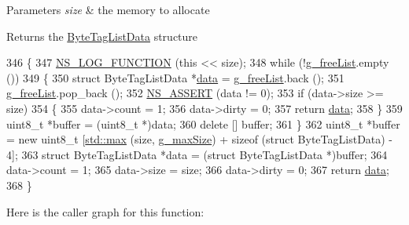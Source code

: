 \begin{DoxyParams}{Parameters}
{\em size} & the memory to allocate \\
\hline
\end{DoxyParams}
\begin{DoxyReturn}{Returns}
the \hyperlink{structns3_1_1ByteTagListData}{Byte\+Tag\+List\+Data} structure 
\end{DoxyReturn}

\begin{DoxyCode}
346 \{
347   \hyperlink{log-macros-disabled_8h_a90b90d5bad1f39cb1b64923ea94c0761}{NS\_LOG\_FUNCTION} (\textcolor{keyword}{this} << size);
348   \textcolor{keywordflow}{while} (!\hyperlink{group__packet_gaed1170b07d22fd956e755d86bf5e5f08}{g\_freeList}.empty ())
349     \{
350       \textcolor{keyword}{struct }ByteTagListData *\hyperlink{topology-example-sim_8cc_a26c65296e316af77b787dc77469bb2a4}{data} = \hyperlink{group__packet_gaed1170b07d22fd956e755d86bf5e5f08}{g\_freeList}.back ();
351       \hyperlink{group__packet_gaed1170b07d22fd956e755d86bf5e5f08}{g\_freeList}.pop\_back ();
352       \hyperlink{assert_8h_a6dccdb0de9b252f60088ce281c49d052}{NS\_ASSERT} (data != 0);
353       \textcolor{keywordflow}{if} (data->size >= size)
354         \{
355           data->count = 1;
356           data->dirty = 0;
357           \textcolor{keywordflow}{return} \hyperlink{topology-example-sim_8cc_a26c65296e316af77b787dc77469bb2a4}{data};
358         \}
359       uint8\_t *buffer = (uint8\_t *)data;
360       \textcolor{keyword}{delete} [] buffer;
361     \}
362   uint8\_t *buffer = \textcolor{keyword}{new} uint8\_t [\hyperlink{80211b_8c_affe776513b24d84b39af8ab0930fef7f}{std::max} (size, \hyperlink{namespacens3_ad6ad8119b41070b28e1d8ec60839f48c}{g\_maxSize}) + \textcolor{keyword}{sizeof} (\textcolor{keyword}{struct }
      ByteTagListData) - 4];
363   \textcolor{keyword}{struct }ByteTagListData *data = (\textcolor{keyword}{struct }ByteTagListData *)buffer;
364   data->count = 1;
365   data->size = size;
366   data->dirty = 0;
367   \textcolor{keywordflow}{return} \hyperlink{topology-example-sim_8cc_a26c65296e316af77b787dc77469bb2a4}{data};
368 \}
\end{DoxyCode}


Here is the caller graph for this function\+:


